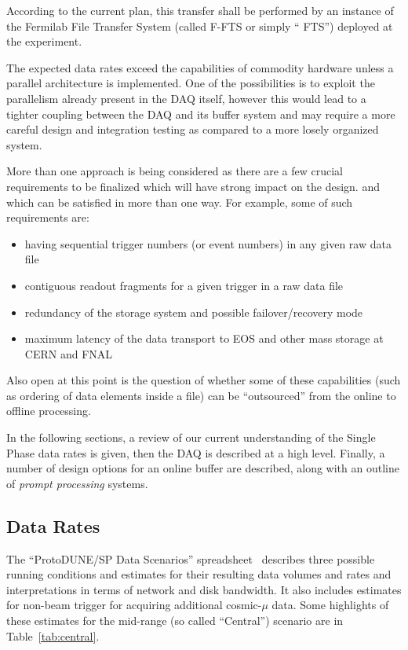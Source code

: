\documentclass[pdftex,12pt,letter]{article}
\newcommand{\pd}{ProtoDUNE\xspace}
\begin{document}
According to the current plan, this transfer shall be performed by
an instance of the Fermilab File Transfer System (called F-FTS or simply `` FTS'') deployed
at the experiment.

The expected data rates exceed the capabilities of commodity hardware
unless a parallel architecture is implemented. One of the possibilities is to
exploit the parallelism already present in the DAQ itself, however this
would lead to a tighter coupling between the DAQ and its buffer system and
may require a more careful design and integration testing as compared to a more
losely organized system.

More than one approach is being considered as there are a few crucial
requirements to be finalized which will have strong impact on the design.
and which can be satisfied in more than one way. For example, some of such
requirements are:

\begin{itemize}

\item having sequential trigger numbers (or event numbers) in any given raw data file

\item contiguous readout fragments for a given trigger in a raw data file

\item redundancy of the storage system and possible failover/recovery mode

\item maximum latency of the data transport to EOS and other mass storage at CERN and FNAL

\end{itemize}

\noindent Also open at this point is the question of whether some of these capabilities (such as ordering of data elements
inside a file) can be ``outsourced'' from the online to offline processing.

In the following sections, a review of our current understanding of
the Single Phase  data rates is given, then the DAQ is described at a high level.
Finally, a number of design options for an online buffer are described, along
with an outline of \textit{prompt processing} systems.

\subsection{Data Rates}

The ``\pd/SP Data Scenarios'' spreadsheet~\cite{data-scenarios}
describes three possible running conditions and estimates for their
resulting data volumes and rates and interpretations in terms of
network and disk bandwidth.  It also includes estimates for non-beam
trigger for acquiring additional cosmic-$\mu$ data.  Some highlights
of these estimates for the mid-range (so called ``Central'')
scenario are in Table~\ref{tab:central}.
\end{document}

